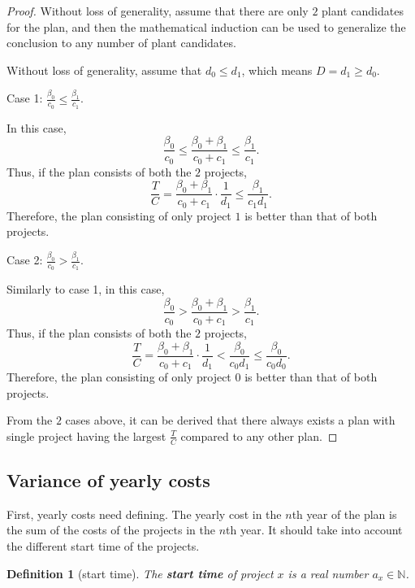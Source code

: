 \documentclass{article}
\newtheorem{definition}{Definition}
\begin{document}
\begin{proof}
Without loss of generality, assume that there are only $2$ plant candidates for the plan,
and then the mathematical induction can be used to generalize the conclusion to any number of plant candidates.

Without loss of generality, assume that $d_0\le d_1$, which means $D=d_1\ge d_0$.

Case 1: $\frac{\beta_0}{c_0}\le\frac{\beta_1}{c_1}$.

In this case,
\begin{equation*}
\frac{\beta_0}{c_0}\le\frac{\beta_0+\beta_1}{c_0+c_1}\le\frac{\beta_1}{c_1}.
\end{equation*}
Thus, if the plan consists of both the $2$ projects,
\begin{equation*}
\frac TC=\frac{\beta_0+\beta_1}{c_0+c_1}\cdot\frac1{d_1}\le\frac{\beta_1}{c_1d_1}.
\end{equation*}
Therefore, the plan consisting of only project $1$ is better than that of both projects.

Case 2: $\frac{\beta_0}{c_0}>\frac{\beta_1}{c_1}$.

Similarly to case 1, in this case,
\begin{equation*}
\frac{\beta_0}{c_0}>\frac{\beta_0+\beta_1}{c_0+c_1}>\frac{\beta_1}{c_1}.
\end{equation*}
Thus, if the plan consists of both the $2$ projects,
\begin{equation*}
\frac TC=\frac{\beta_0+\beta_1}{c_0+c_1}\cdot\frac1{d_1}<\frac{\beta_0}{c_0d_1}\le\frac{\beta_0}{c_0d_0}.
\end{equation*}
Therefore, the plan consisting of only project $0$ is better than that of both projects.

From the $2$ cases above, it can be derived that there always exists a plan with single project having the largest $\frac TC$ compared to any other plan.
\end{proof}

\subsection{Variance of yearly costs}
\label{sec:variance of yearly costs}

First, yearly costs need defining.
The yearly cost in the $n$th year of the plan is the sum of the costs of the projects in the $n$th year.
It should take into account the different start time of the projects.

\begin{definition}[start time]
The \textbf{start time} of project $x$ is a real number $a_x\in\mathbb N$.
\end{definition}
\end{document}

